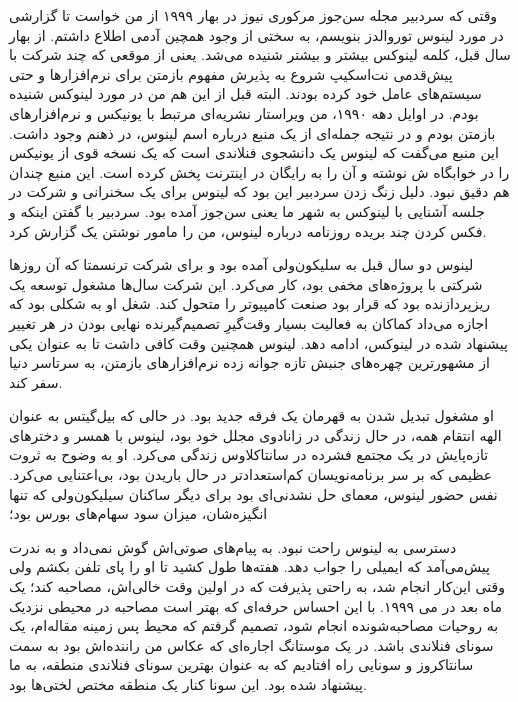 \begin{journal}
وقتی که سردبیر مجله‌ سن‌جوز مرکوری نیوز
در بهار ۱۹۹۹ از من خواست تا گزارشی در مورد لینوس توروالدز بنویسم، به
سختی از وجود همچین آدمی اطلاع داشتم. از بهار سال قبل، کلمه لینوکس
بیشتر و بیشتر شنیده می‌شد. یعنی از موقعی که چند شرکت با پیش‌قدمی
نت‌اسکیپ
شروع به پذیرش مفهوم بازمتن برای
نرم‌افزارها و حتی سیستم‌های عامل خود کرده بودند. البته قبل از این هم من
در مورد لینوکس شنیده بودم. در اوایل دهه ۱۹۹۰، من ویراستار نشریه‌ای
مرتبط با یونیکس و نرم‌افزارهای بازمتن بودم و در نتیجه جمله‌ای از یک منبع
درباره اسم لینوس، در ذهنم وجود داشت. این منبع می‌گفت که لینوس یک
دانشجوی فنلاندی است که یک نسخه قوی از یونیکس را در خوابگاه ش نوشته و
آن را به رایگان در اینترنت پخش کرده است. این منبع چندان هم دقیق
نبود. دلیل زنگ زدن سردبیر این بود که لینوس برای یک سخنرانی و شرکت در
جلسه آشنایی با لینوکس به شهر ما یعنی سن‌جوز آمده بود. سردبیر با گفتن
اینکه  و فکس کردن چند بریده روزنامه
درباره لینوس، من را مامور نوشتن یک گزارش کرد.

لینوس دو سال قبل به سلیکون‌ولی
آمده بود و برای شرکت ترنسمتا که آن
روزها شرکتی با پروژه‌های مخفی بود، کار می‌کرد. این شرکت سال‌ها مشغول
توسعه یک ریزپردازنده بود که قرار بود صنعت کامپیوتر را متحول کند. شغل
او به شکلی بود که اجازه می‌داد کماکان به فعالیت بسیار وقت‌گیرِ
تصمیم‌گیرنده نهایی بودن در هر تغییر پیشنهاد شده در لینوکس، ادامه
دهد. لینوس همچنین وقت کافی داشت تا به عنوان یکی‌ از مشهورترین چهره‌های
جنبش تازه جوانه زده نرم‌افزارهای بازمتن، به سرتاسر دنیا سفر کند.

او مشغول تبدیل شدن به قهرمان یک فرقه جدید بود. در حالی که
بیل‌گیتس به عنوان
الهه انتقام همه، در حال زندگی در زانادوی مجلل خود
بود، لینوس با همسر و دخترهای تازه‌پایش در یک مجتمع فشرده در سانتاکلاوس
زندگی‌ می‌کرد. او به وضوح به ثروت عظیمی که بر سر برنامه‌نویسان
کم‌استعدادتر در حال باریدن بود، بی‌اعتنایی می‌کرد. نفس حضور لینوس، معمای
حل نشدنی‌ای بود برای دیگر ساکنان سیلیکون‌ولی که تنها انگیزه‌شان، میزان
سود سهام‌های بورس بود؛ 

دسترسی به لینوس راحت نبود. به پیام‌های صوتی‌اش گوش نمی‌داد و به ندرت
پیش‌می‌آمد که ایمیلی را جواب دهد. هفته‌ها طول کشید تا او را پای تلفن بکشم
ولی وقتی این‌کار انجام شد، به راحتی‌ پذیرفت که در اولین وقت خالی‌اش،
مصاحبه کند؛ یک ماه بعد در می ۱۹۹۹. با این احساس حرفه‌ای که بهتر است
مصاحبه در محیطی نزدیک به روحیات مصاحبه‌شونده انجام شود، تصمیم گرفتم که
محیط پس زمینه مقاله‌ام، یک سونای فنلاندی باشد. در یک
موستانگ اجاره‌ای که عکاس من راننده‌اش بود به سمت
سانتاکروز و سونایی راه افتادیم که به عنوان بهترین سونای فنلاندی منطقه،
به ما پیشنهاد شده بود. این سونا کنار یک منطقه مختص لختی‌ها بود.


\end{journal}
